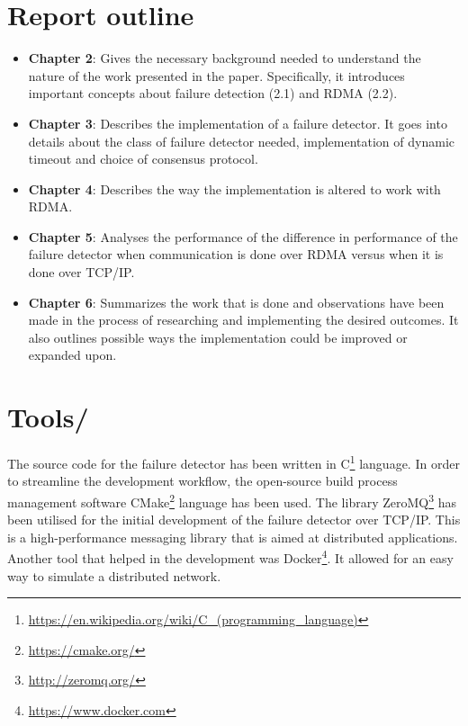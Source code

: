 \documentclass[bsc,frontabs,twoside,singlespacing,parskip,deptreport,hidel]{infthesis}     %
\begin{document}
\section{Report outline}
\begin{itemize}
  \item \textbf{Chapter 2}: Gives the necessary background needed to understand the nature of the work presented in the paper. Specifically, it introduces important concepts about failure detection (2.1) and RDMA (2.2).
  \item \textbf{Chapter 3}: Describes the implementation of a failure detector. It goes into details about the class of failure detector needed, implementation of dynamic timeout and choice of consensus protocol.
  \item \textbf{Chapter 4}: Describes the way the implementation is altered to work with RDMA. 
  \item \textbf{Chapter 5}: Analyses the performance of the difference in performance of the failure detector when communication is done over RDMA versus when it is done over TCP/IP.
  \item \textbf{Chapter 6}: Summarizes the work that is done and observations have been made in the process of researching and implementing the desired outcomes. It also outlines possible ways the implementation could be improved or expanded upon.
\end{itemize}

\section{Tools/}

The source code for the failure detector has been written in C\footnote{\url{https://en.wikipedia.org/wiki/C_(programming_language)}} language. In order to streamline the development workflow, the open-source build process management software CMake\footnote{\url{https://cmake.org/}} language has been used. The library ZeroMQ\footnote{\url{http://zeromq.org/}} has been utilised for the initial development of the failure detector over TCP/IP. This is a high-performance messaging library that is aimed at distributed applications. Another tool that helped in the development was Docker\footnote{\url{https://www.docker.com}}. It allowed for an easy way to simulate a distributed network.


\end{document}
